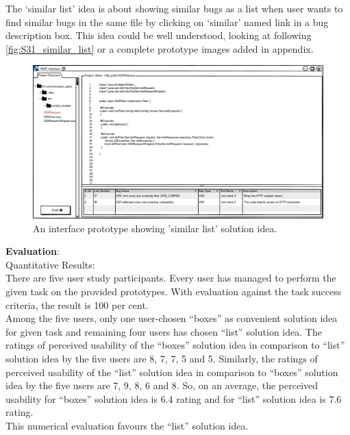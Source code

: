 The ‘similar list’ idea is about showing similar bugs as a list when user wants to find similar bugs in the same file by clicking on ‘similar’ named link in a bug description box. This idea could be well understood, looking at following \autoref{fig:S31_similar_list} or a complete prototype images added in appendix. \\


\begin{figure}[hbt!]
	\centering
	\includegraphics[width=\linewidth]{figures/solution_ideas_snaps/S31_similar_list}
	\caption{An interface prototype showing 'similar list' solution idea.}
	\label{fig:S31_similar_list}
\end{figure} 


\textbf{Evaluation}: \\

Quantitative Results: \\

There are five user study participants. Every user has managed to perform the given task on the provided prototypes. With evaluation against the task success criteria, the result is 100 per cent. \\

Among the five users, only one user-chosen “boxes” as convenient solution idea for given task and remaining four users has chosen “list” solution idea. The ratings of perceived usability of the “boxes” solution idea in comparison to “list” solution idea by the five users are 8, 7, 7, 5 and 5. Similarly, the ratings of perceived usability of the “list” solution idea in comparison to “boxes” solution idea by the five users are 7, 9, 8, 6 and 8. So, on an average, the perceived usability for “boxes” solution idea is 6.4 rating and for “list” solution idea is 7.6 rating. \\

This numerical evaluation favours the “list” solution idea. \\


